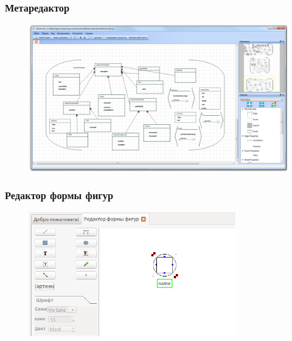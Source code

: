 \documentclass[14pt]{beamer}
\begin{document}
\begin{frame}
    \frametitle{Метаредактор}
    \begin{figure}
        \begin{center}
      		\includegraphics[width=\textwidth]{images/presentation/metaeditor.png}
        \end{center}
    \end{figure}
\end{frame}

\begin{frame}
    \frametitle{Редактор формы фигур}
    \begin{figure}
        \begin{center}
      		\includegraphics[width=0.8\textwidth]{images/presentation/shapeEditor.png}
        \end{center}
    \end{figure}
\end{frame}
\end{document}
